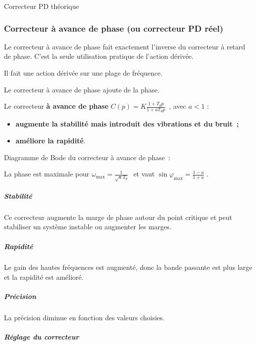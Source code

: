 Correcteur PD théorique

\hypertarget{correcteur-uxe0-avance-de-phase-ou-correcteur-pd-ruxe9el}{%
\subsubsection{Correcteur à avance de phase (ou correcteur PD réel)}\label{correcteur-uxe0-avance-de-phase-ou-correcteur-pd-ruxe9el}}

Le correcteur à avance de phase fait exactement l'inverse du correcteur à retard de phase. C'est la seule utilisation pratique de l'action dérivée.

Il fait une action dérivée sur une plage de fréquence.

Le correcteur à avance de phase ajoute de la phase.

Le correcteur \textbf{à avance de phase} \(C(p) = K\frac{1 + T_{d}p}{1 + aT_{d}p}\)~, avec \(a < 1\) :

\begin{itemize}
\item
  \textbf{augmente la stabilité mais introduit des vibrations et du bruit~;}
\item
  \textbf{améliore la rapidité}.
\end{itemize}

Diagramme de Bode du correcteur à avance de phase~:

La phase est maximale pour \(\omega_{\max} = \frac{1}{\sqrt{a}T_{d}}\ \ \) et vaut \(\sin\varphi_{\max} = \frac{1 - a}{1 + a}\) .

\hypertarget{stabilituxe9-4}{%
\subparagraph*{Stabilité}\label{stabilituxe9-4}}

Ce correcteur augmente la marge de phase autour du point critique et peut stabiliser un système instable ou augmenter les marges.

\hypertarget{rapidituxe9-4}{%
\subparagraph*{Rapidité}\label{rapidituxe9-4}}

Le gain des hautes fréquences est augmenté, donc la bande passante est plus large et la rapidité est amélioré.

\hypertarget{pruxe9cision-4}{%
\subparagraph*{Précision}\label{pruxe9cision-4}}

La précision diminue en fonction des valeurs choisies.

\hypertarget{ruxe9glage-du-correcteur-2}{%
\subparagraph*{Réglage du correcteur}\label{ruxe9glage-du-correcteur-2}}

